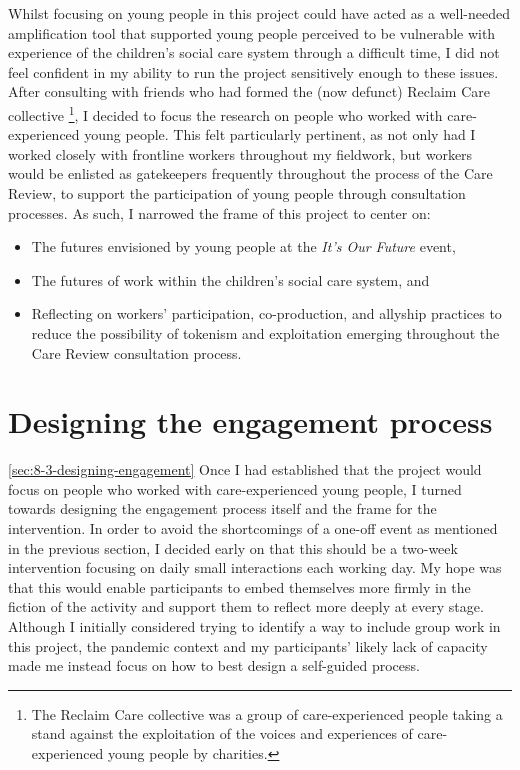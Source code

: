 Whilst focusing on young people in this project could have acted as a well-needed amplification tool that supported young people perceived to be vulnerable with experience of the children's social care system through a difficult time, I did not feel confident in my ability to run the project sensitively enough to these issues. After consulting with friends who had formed the (now defunct) Reclaim Care collective \footnote{The Reclaim Care collective was a group of care-experienced people taking a stand against the exploitation of the voices and experiences of care-experienced young people by charities.}, I decided to focus the research on people who worked with care-experienced young people. This felt particularly pertinent, as not only had I worked closely with frontline workers throughout my fieldwork, but workers would be enlisted as gatekeepers frequently throughout the process of the Care Review, to support the participation of young people through consultation processes. As such, I narrowed the frame of this project to center on:
\begin{itemize}
    \item The futures envisioned by young people at the \emph{It's Our Future} event,
    \item The futures of work within the children's social care system, and
    \item Reflecting on workers' participation, co-production, and allyship practices to reduce the possibility of tokenism and exploitation emerging throughout the Care Review consultation process. 
\end{itemize}

\section{Designing the engagement process}
\ref{sec:8-3-designing-engagement}
Once I had established that the project would focus on people who worked with care-experienced young people, I turned towards designing the engagement process itself and the frame for the intervention. In order to avoid the shortcomings of a one-off event as mentioned in the previous section, I decided early on that this should be a two-week intervention focusing on daily small interactions each working day. My hope was that this would enable participants to embed themselves more firmly in the fiction of the activity and support them to reflect more deeply at every stage. Although I initially considered trying to identify a way to include group work in this project, the pandemic context and my participants' likely lack of capacity made me instead focus on how to best design a self-guided process.

